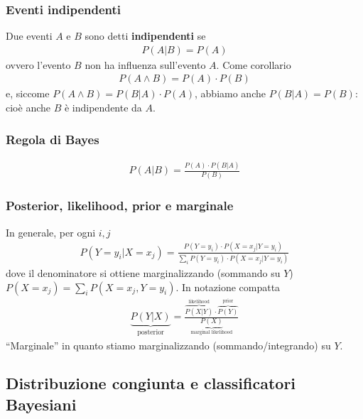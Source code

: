 \documentclass[a4paper,12pt]{article}
\begin{document}
\subsubsection{Eventi indipendenti}
Due eventi $A$ e $B$ sono detti \textbf{indipendenti} se
\begin{align*}
    P(A|B) = P(A)
\end{align*}
ovvero l'evento $B$ non ha influenza sull'evento $A$. Come corollario
\begin{align*}
    P(A\land B) = P(A)\cdot P(B)
\end{align*}
e, siccome $P(A\land B) = P(B|A)\cdot P(A)$, abbiamo anche $P(B|A)=P(B)$: cioè anche $B$ è indipendente da $A$.

\subsubsection{Regola di Bayes}
\begin{align*}
    P(A|B) = \frac{P(A)\cdot P(B|A)}{P(B)}
\end{align*}


\subsubsection{Posterior, likelihood, prior e marginale}
In generale, per ogni $i,j$
\begin{align*}
    P(Y=y_i|X=x_j) = \frac{P(Y=y_i)\cdot P(X=x_j|Y=y_i)}{\sum_i P(Y=y_i)\cdot P(X=x_j|Y=y_i)}
\end{align*}
dove il denominatore si ottiene marginalizzando (sommando su $Y$) $P(X=x_j) = \sum_i P(X=x_j,Y=y_i)$. In notazione compatta
\begin{align*}
    \underbrace{P(Y|X)}_{\text{posterior}} = \frac{\overbrace{P(X|Y)}^{\text{likelihood}}\cdot\overbrace{P(Y)}^{\text{prior}}}{\underbrace{P(X)}_{\text{marginal likelihood}}}
\end{align*}
``Marginale'' in quanto stiamo marginalizzando (sommando/integrando) su $Y$.
\subsection{Distribuzione congiunta e classificatori Bayesiani}
\end{document}
